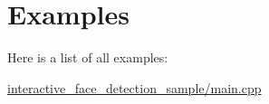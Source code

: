 \section{Examples}
Here is a list of all examples\+:\begin{DoxyCompactItemize}
\item 
\hyperlink{interactive_face_detection_sample_2main_8cpp-example}{interactive\+\_\+face\+\_\+detection\+\_\+sample/main.\+cpp}
\end{DoxyCompactItemize}

